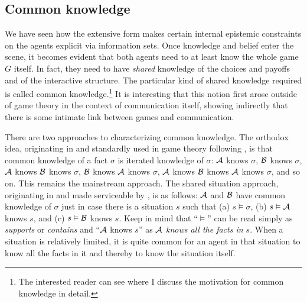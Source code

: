 \subsection{Common knowledge}

We have seen how the extensive form makes certain internal epistemic constraints on the agents explicit via information sets. Once knowledge and belief enter the scene, it becomes evident that both agents need to at least know the whole game $G$ itself. In fact, they need to have \emph{shared} knowledge of the choices and payoffs and of the interactive structure. The particular kind of shared knowledge required is called common knowledge.\footnote{The interested reader can see \citet[Section~5.3]{parikh:ul} where I discuss the motivation for common knowledge in detail.} It is interesting that this notion first arose outside of game theory in the context of communication itself, showing indirectly that there is some intimate link between games and communication.

There are two approaches to characterizing common knowledge. The orthodox idea, originating in \citet{schiffer:m} and standardly used in game theory following \citet{aumann:ad}, is that common knowledge of a fact $\sigma$ is iterated knowledge of $\sigma$: $\cal A$ knows $\sigma$, $\cal B$ knows $\sigma$, $\cal A$ knows $\cal B$ knows $\sigma$, $\cal B$ knows $\cal A$ knows $\sigma$, $\cal A$ knows $\cal B$ knows $\cal A$ knows $\sigma$, and so on. This remains the mainstream approach. The shared situation approach, originating in \citet[Chapter II, Section~1]{lewis:c} and made serviceable by \citet{b:tarkck, b:mtck}, is as follows: $\cal A$ and $\cal B$ have common knowledge of $\sigma$ just in case there is a situation $s$ such that (a) $s \vDash \sigma$, (b) $s \vDash {\cal A}$ \hbox{knows} $s$, and (c) $s \vDash {\cal B}$ \hbox{knows} $s$. Keep in mind that ``$\vDash$'' can be read simply as \emph{supports} or \emph{contains} and ``$\cal A$ knows $s$'' as \emph{$\cal A$ knows all the facts in $s$}. When a situation is relatively limited, it is quite common for an agent in that situation to know all the facts in it and thereby to know the situation itself.


